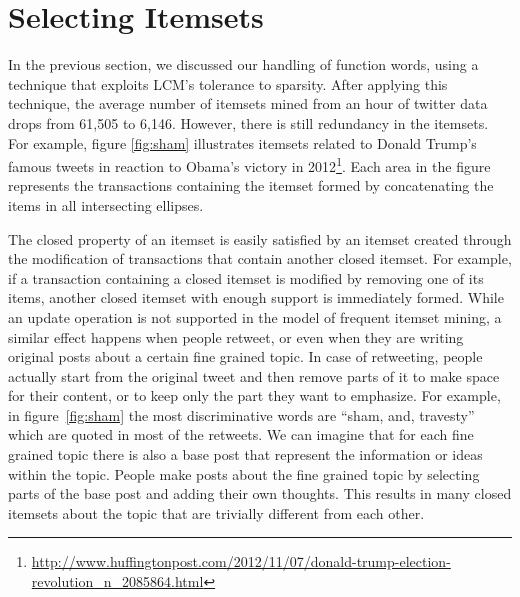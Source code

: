 \documentclass{sig-alternate}
\begin{document}
\section{Selecting Itemsets} %
\label{sec:strong}



In the previous section, we discussed our handling of function words,
using a technique that exploits LCM's tolerance to sparsity.
After applying this technique, the average number of itemsets mined from an
hour of twitter data drops from 61,505 to 6,146.
However, there is still redundancy in the itemsets.
For example, figure \ref{fig:sham} illustrates  itemsets related to Donald
Trump's famous tweets in reaction to Obama's victory in
2012\footnote{\url{http://www.huffingtonpost.com/2012/11/07/donald-trump-election-revolution_n_2085864.html}}.  
Each area in the figure represents the transactions containing the itemset
formed by concatenating the items in all intersecting ellipses. 

The closed property of an itemset is easily satisfied by an itemset
created through the modification of 
transactions that contain another closed itemset.
For example, if a transaction containing a closed itemset
is modified by removing one of its items,
another closed itemset with enough support is immediately formed.
While an update operation is not supported in the model of frequent itemset mining, 
a similar effect happens when people retweet, 
or even when they are writing original posts about 
a certain fine grained topic.
In case of retweeting, people actually start from the original tweet and 
then remove parts of it to make space for their content,
or to keep only the part they want to emphasize. 
For example, in figure~\ref{fig:sham}  the most discriminative words are ``sham, and, travesty''
which are quoted 
in most of the retweets.
We can imagine that for each fine grained topic there is also a base post
that represent the information or ideas within the topic. 
People make posts about the fine grained topic 
by selecting parts of the base post
and adding their own thoughts.
This results in many closed itemsets 
about the topic that
are trivially different from each other.
\end{document}

